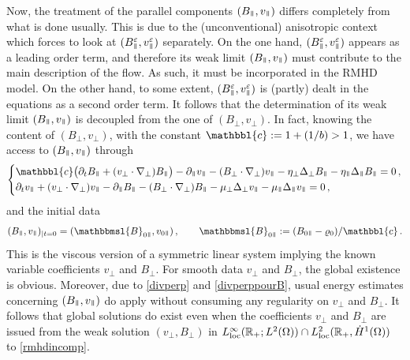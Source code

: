 \documentclass[11pt,reqno]{amsart}
\def \R{{\mathbb{R}}}
\newcommand{\myparallel}{{\mkern3mu\vphantom{\perp}\vrule depth 0pt\mkern2mu\vrule depth 0pt\mkern3mu}}
\begin{document}
Now, the treatment of the parallel components $ (B_\myparallel , v_\myparallel ) $ differs completely from what is done  usually. This is due to the (unconventional) anisotropic context which forces to look at $ (B^\varepsilon_\myparallel , v^\varepsilon_\myparallel ) $ separately. On the one hand, $  (B^\varepsilon_\myparallel , v^\varepsilon_\myparallel ) $ appears as a leading order term, and therefore its weak limit $  (B_\myparallel , v_\myparallel ) $ must contribute to the main description of the flow. As such, it must be incorporated in the RMHD  model. On the other hand, to some extent, $  (B^\varepsilon_\myparallel , v^\varepsilon_\myparallel ) $ is (partly) dealt in the equations as a second order term. It follows that the  determination of its weak limit $ (B_\myparallel , v_\myparallel ) $ is decoupled from the one of $ (B_\perp , v_\perp ) $. In fact, knowing the content of $ (B_\perp , v_\perp ) $, with the constant $ \mathbbl{c} := 1 + (1/b) > 1 $, we have access to $ (B_\myparallel , v_\myparallel ) $ through
\begin{equation}
\left \{      
\begin{aligned}
& \mathbbl{c} \bigl( \partial_t B_\myparallel + (v_\perp \cdot \nabla_\perp) B_\myparallel \bigr) - \partial_\myparallel v_\myparallel - (B_\perp \cdot \nabla_\perp) v_\myparallel
  -\eta_\perp \Delta_\perp B_\myparallel -\eta_\myparallel \Delta_\myparallel B_\myparallel=0\, , \\
  &\partial_t v_\myparallel + (v_\perp \cdot \nabla_\perp) v_\myparallel -\partial_\myparallel B_\myparallel  - (B_\perp \cdot \nabla_\perp) B_\myparallel
  -\mu_\perp \Delta_\perp v_\myparallel -\mu_\myparallel \Delta_\myparallel v_\myparallel = 0\, ,
\end{aligned}
\right.
\label{rmhd}
\end{equation}
and the initial data
\begin{equation}
  \label{inidatparal}
  (B_\myparallel,v_\myparallel)_{\mid t=0} = (\mathbbmsl{B}_{0\myparallel} , v_{0\myparallel} ) \, , \qquad
 \mathbbmsl{B}_{0\myparallel} := (B_{0\myparallel} - \varrho_0 )/\mathbbl{c} \, .
\end{equation}
This is the viscous version of a symmetric linear system implying the known  variable coefficients $ v_\perp $ and $ B_\perp $. For smooth data $ v_\perp $ and $ B_\perp $, the global existence is obvious. Moreover, due to \eqref{divperp} and \eqref{divperppourB}, usual energy estimates concerning $ (B_\myparallel,v_\myparallel) $ do apply without consuming any regularity on $ v_\perp $ and $ B_\perp $. It follows that global solutions do exist even when the coefficients $ v_\perp $ and $ B_\perp $ are issued from the weak solution $ (v_\perp , B_\perp ) $ in $ L_{\rm loc}^\infty(\R_+; L^2(\Omega)) \cap L_{\rm loc}^2(\R_+, \dot H^1(\Omega)) $ to  \eqref{rmhdincomp}.
\end{document}

